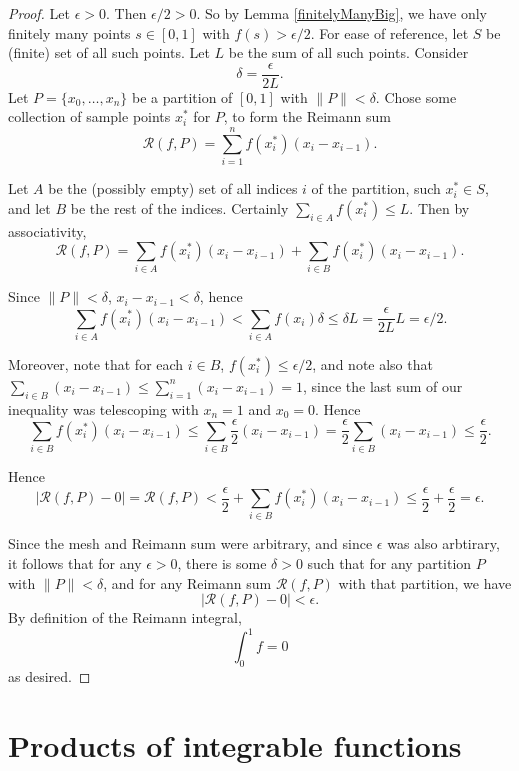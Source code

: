 \documentclass[12pt]{article}
\newcommand\norm[1]{\lVert#1\rVert} %
\newcommand\rsum[2]{\mathcal{R} (#1,#2)} %
\theoremstyle{definition}
\begin{document}
\begin{proof}

    Let $\epsilon > 0$. Then $\epsilon/2 > 0$. So by Lemma \ref{finitelyManyBig}, we have only finitely many points $s\in [0,1]$ with $ f(s) > \epsilon /2 $. For ease of reference, let $S$ be (finite) set of all such points. Let $L$ be the sum of all such points. Consider 
    \[
        \delta = \frac{\epsilon}{2L}.
        \]
    Let $P = \{x_0, \dots, x_n\}$ be a partition of $ [0,1] $ with $\norm{P} < \delta$. Chose some collection of sample points $x_i^*$ for $P$, to form the Reimann sum 
    \[
    \mathcal{R}(f,P) = \sum_{i=1}^n f(x_i^*)(x_i - x_{i - 1}).     
    \]

    Let $A$ be the (possibly empty) set of all indices $i$ of the partition, such $x_i^*\in S$, and let $B$ be the rest of the indices. Certainly $ \sum_{i\in A}f(x_i^*) \le L $. Then by associativity,
    \[
        \mathcal{R}(f,P) = \sum_{i \in A}f(x_i^*)(x_i - x_{i-1}) + \sum_{i\in B}f(x_i^*)(x_i - x_{i-1}).
        \]

    Since $ \norm{P} < \delta $, $ x_i - x_{i -1} < \delta$, hence 
    \[
    \sum_{i \in A}f(x_i^*)(x_i - x_{i -1}) < \sum_{i \in A}f(x_i)\delta \le \delta L = \frac{\epsilon}{2L}L = \epsilon/2.   
    \]

    Moreover, note that for each $i\in B$, $ f(x_i^*)\le \epsilon/2 $, and note also that $\sum_{i\in B}(x_i - x_{i-1})\le \sum_{i = 1}^n (x_i - x_{i - 1}) = 1$, since the last sum of our inequality was telescoping with $x_n = 1$ and $x_0 = 0$. Hence 
    \[
    \sum_{i\in B}f(x_i^*)(x_i - x_{i - 1}) \le \sum_{i\in B}\frac{\epsilon}{2}(x_i - x_{i - 1}) = \frac{\epsilon}{2}\sum_{i\in B}(x_i - x_{i - 1}) 
    \le \frac{\epsilon}{2}.    
    \]

    Hence 
    \[
        \left|\rsum{f}{P} - 0\right| = \rsum{f}{P} < \frac{\epsilon}{2} + \sum_{i \in B}f(x_i^*)(x_i - x_{i - 1}) \le \frac{\epsilon}{2} + \frac{\epsilon}{2} = \epsilon.
        \]

    Since the mesh and Reimann sum were arbitrary, and since $\epsilon$ was also arbtirary, it follows that for any $\epsilon > 0$, there is some $\delta > 0$ such that for any partition $P$ with $\norm{P} < \delta$, and for any Reimann sum $\rsum{f}{P}$ with that partition, we have 
    \[
    \left|\rsum{f}{P} - 0\right| < \epsilon.    
    \]
    By definition of the Reimann integral, 
    \[
    \int_0^1f = 0    
    \]
    as desired.
\end{proof}

\section{Products of integrable functions}
\end{document}
